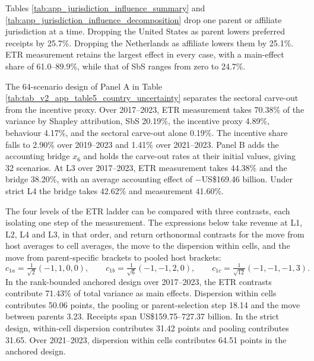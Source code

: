 \documentclass[11pt,a4paper]{article}
\newcommand{\usd}{US\$}
\begin{document}



Tables \ref{tab:app_jurisdiction_influence_summary} and \ref{tab:app_jurisdiction_influence_decomposition} drop one parent or affiliate jurisdiction at a time. Dropping the United States as parent lowers preferred receipts by 25.7\%. Dropping the Netherlands as affiliate lowers them by 25.1\%. ETR measurement retains the largest effect in every case, with a main-effect share of 61.0–89.9\%, while that of SbS ranges from zero to 24.7\%.

The 64-scenario design of Panel A in Table \ref{tab:tab_v2_app_table5_country_uncertainty} separates the sectoral carve-out from the incentive proxy. Over 2017–2023, ETR measurement takes 70.38\% of the variance by Shapley attribution, SbS 20.19\%, the incentive proxy 4.89\%, behaviour 4.17\%, and the sectoral carve-out alone 0.19\%. The incentive share falls to 2.90\% over 2019–2023 and 1.41\% over 2021–2023. Panel B adds the accounting bridge $x_6$ and holds the carve-out rates at their initial values, giving 32 scenarios. At L3 over 2017–2023, ETR measurement takes 44.38\% and the bridge 38.20\%, with an average accounting effect of $-$\usd169.46 billion. Under strict L4 the bridge takes 42.62\% and measurement 41.60\%.



The four levels of the ETR ladder can be compared with three contrasts, each isolating one step of the measurement. The expressions below take revenue at L1, L2, L4 and L3, in that order, and return orthonormal contrasts for the move from host averages to cell averages, the move to the dispersion within cells, and the move from parent-specific brackets to pooled host brackets:
\begin{equation}\label{eq:app_helmert}
c_{1a}=\tfrac{1}{\sqrt2}(-1,1,0,0),\qquad
c_{1b}=\tfrac{1}{\sqrt6}(-1,-1,2,0),\qquad
c_{1c}=\tfrac{1}{\sqrt{12}}(-1,-1,-1,3).
\end{equation}
In the rank-bounded anchored design over 2017–2023, the ETR contrasts contribute 71.43\% of total variance as main effects. Dispersion within cells contributes 50.06 points, the pooling or parent-selection step 18.14 and the move between parents 3.23. Receipts span \usd159.75–727.37 billion. In the strict design, within-cell dispersion contributes 31.42 points and pooling contributes 31.65. Over 2021–2023, dispersion within cells contributes 64.51 points in the anchored design.
\end{document}
